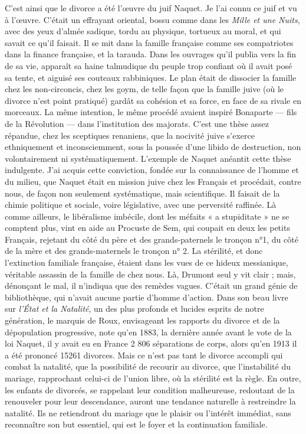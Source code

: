 \documentclass[french,twoside]{book} %
\begin{document}
C’est ainsi que le divorce a été l’œuvre du juif Naquet. Je l’ai connu ce juif et vu à l’œuvre. C’était un effrayant oriental, bossu comme dans les {\itshape Mille et une Nuits}, avec des yeux d’almée sadique, tordu au physique, tortueux au moral, et qui savait ce qu’il faisait. Il se mit dans la famille française comme ses compatriotes dans la finance française, et la tarauda. Dans les ouvrages qu’il publia vers la fin de sa vie, apparaît sa haine talmudique du peuple trop confiant où il avait posé sa tente, et aiguisé ses couteaux rabbiniques. Le plan était de dissocier la famille chez les non-circoncis, chez les goym, de telle façon que la famille juive (où le divorce n’est point pratiqué) gardât sa cohésion et sa force, en face de sa rivale en morceaux. La même intention, le même procédé avaient inspiré Bonaparte — fils de la Révolution — dans l’institution des majorats. C’est une thèse assez répandue, chez les sceptiques renaniens, que la nocivité juive s’exerce ethniquement et inconsciemment, sous la poussée d’une libido de destruction, non volontairement ni systématiquement. L’exemple de Naquet anéantit cette thèse indulgente. J’ai acquis cette conviction, fondée sur la connaissance de l’homme et du milieu, que Naquet était en mission juive chez les Français et procédait, contre nous, de façon non seulement systématique, mais scientifique. Il faisait de la chimie politique et sociale, voire législative, avec une perversité raffinée. Là comme ailleurs, le libéralisme imbécile, dont les méfaits « a stupiditate » ne se comptent plus, vint en aide au Procuste de Sem, qui coupait en deux les petits Français, rejetant du côté du père et des grands-paternels le tronçon n°1, du côté de la mère et des grands-maternels le tronçon n° 2. La stérilité, et donc l’extinction familiale française, étaient dans les vues de ce hideux messianique, véritable assassin de la famille de chez nous. Là, Drumont seul y vit clair ; mais, dénonçant le mal, il n’indiqua que des remèdes vagues. C’était un grand génie de bibliothèque, qui n’avait aucune partie d’homme d’action. Dans son beau livre sur {\itshape l’État et la Natalité}, un des plus profonds et lucides esprits de notre génération, le marquis de Roux, envisageant les rapports du divorce et de la dépopulation progressive, note qu’en 1883, la dernière année avant le vote de la loi Naquet, il y avait eu en France 2 806 séparations de corps, alors qu’en 1913 il a été prononcé 15261 divorces. Mais ce n’est pas tant le divorce accompli qui combat la natalité, que la possibilité de recourir au divorce, que l’instabilité du mariage, rapprochant celui-ci de l’union libre, où la stérilité est la règle. En outre, les enfants de divorcés, se rappelant leur condition malheureuse, redoutant de la renouveler pour leur descendance, auront une tendance naturelle à restreindre la natalité. Ils ne retiendront du mariage que le plaisir ou l’intérêt immédiat, sans reconnaître son but essentiel, qui est le foyer et la continuation familiale.\par
\end{document}
